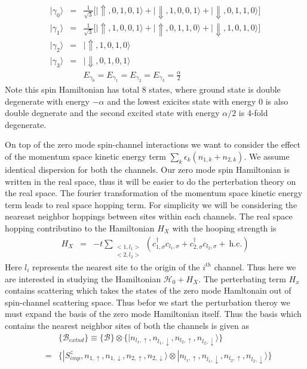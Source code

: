 \documentclass[reprint,prb,superscriptaddress]{revtex4-1}
\begin{document}
\begin{eqnarray}
|\gamma_{0}\rangle &=&\frac{1}{\sqrt{3}} \bigg[|\Uparrow,0,1,0,1\rangle+|\Downarrow,1,0,0,1\rangle+|\Downarrow,0,1,1,0\rangle \bigg] \nonumber\\
|\gamma_{1}\rangle &=& \frac{1}{\sqrt{3}}\bigg[ |\Uparrow,1,0,0,1\rangle+|\Uparrow,0,1,1,0\rangle+|\Downarrow,1,0,1,0\rangle \bigg] \nonumber\\
|\gamma_{2}\rangle &=& |\Uparrow,1,0,1,0\rangle \nonumber\\
|\gamma_{3}\rangle &=& |\Downarrow,0,1,0,1\rangle \\
&& E_{\gamma_0}=E_{\gamma_1}=E_{\gamma_2}=E_{\gamma_3}=\frac{\alpha}{2}
\end{eqnarray}
Note this spin Hamiltonian has total $8$ states, where ground state is double degenerate with energy $-\alpha$ and the lowest exicites state with energy $0$ is also double degnerate and the second excited state with energy $\alpha/2$ is 4-fold degenerate. 
\par On top of the zero mode spin-channel interactions we want to consider the effect of the momentum space kinetic energy term $\sum_{k}\epsilon_k (n_{1,k}+n_{2,k})$. We assume identical dispersion for both the channels. Our zero mode spin Hamiltonian is written in the real space, thus it will be easier to do the perterbation theory on the real space. The fourier transformation of the momentum space kinetic energy  term leads to real space hopping term. For simplicity we will be considering the neareast neighbor hoppings between sites within each channels. The real space hopping contributino to the Hamiltonian $H_X$ with the hooping strength is 
\begin{eqnarray}
H_{X} &=& -t \displaystyle\sum_{\substack{<1,l_1> \\ <2,l_2>}} (c^{\dagger}_{1,\sigma}c_{l_1,\sigma}+c^{\dagger}_{2,\sigma}c_{l_2,\sigma}+ ~\textrm{h.c.})
\end{eqnarray}
Here $l_i$ represents the nearest site to the origin of the $i^{th}$ channel. Thus here we are interested in studying the Hamiltonian $\mathcal{H}_0+H_X$. The perterbating term $H_x$ contains scattering which takes the states of the zero mode Hamltonain out of spin-channel scattering space. Thus befor we start the perturbation theroy we must expand the basis of the zero mode Hamiltonian itself. Thus the basis which contains the nearest neighbor sites of both the channels is given as 
\begin{eqnarray}
&&\{\mathcal{B}_{extnd}\} \equiv  \{\mathcal{B}\} \otimes  \{|n_{l_1,\uparrow},n_{l_1,\downarrow},n_{l_2,\uparrow},n_{l_2,\downarrow}\rangle\} \nonumber\\
&=& \{|S^z_{imp},n_{1,\uparrow},n_{1,\downarrow},n_{2,\uparrow},n_{2,\downarrow}\rangle \otimes |n_{l_1,\uparrow},n_{l_1,\downarrow},n_{l_2,\uparrow},n_{l_2,\downarrow}\rangle\} \nonumber\\
\end{eqnarray}
\end{document}
